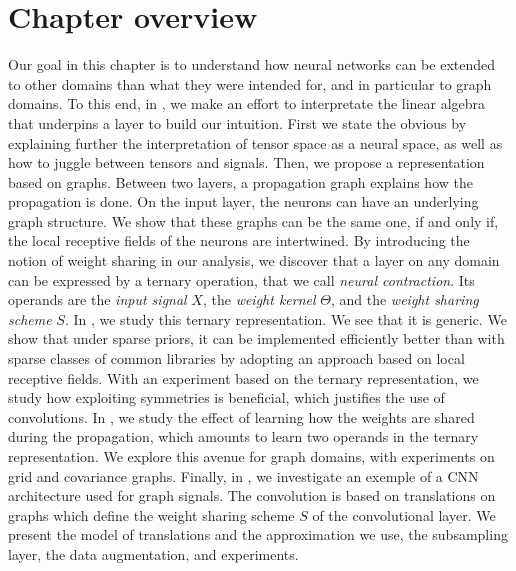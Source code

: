 \section*{Chapter overview}

Our goal in this chapter is to understand how neural networks can be extended to other domains than what they were intended for, and in particular to graph domains. To this end, in , we make an effort to interpretate the linear algebra that underpins a layer to build our intuition. First we state the obvious by explaining further the interpretation of tensor space as a neural space, as well as how to juggle between tensors and signals. Then, we propose a representation based on graphs. Between two layers, a propagation graph explains how the propagation is done. On the input layer, the neurons can have an underlying graph structure. We show that these graphs can be the same one, if and only if, the local receptive fields of the neurons are intertwined. By introducing the notion of weight sharing in our analysis, we discover that a layer on any domain can be expressed by a ternary operation, that we call \emph{neural contraction}. Its operands are the \emph{input signal} $X$, the \emph{weight kernel} $\Theta$, and the \emph{weight sharing scheme} $S$. In , we study this ternary representation. We see that it is generic. We show that under sparse priors, it can be implemented efficiently better than with sparse classes of common libraries by adopting an approach based on local receptive fields. With an experiment based on the ternary representation, we study how exploiting symmetries is beneficial, which justifies the use of convolutions. In , we study the effect of learning how the weights are shared during the propagation, which amounts to learn two operands in the ternary representation. We explore this avenue for graph domains, with experiments on grid and covariance graphs. Finally, in , we investigate an exemple of a CNN architecture used for graph signals. The convolution is based on translations on graphs which define the weight sharing scheme $S$ of the convolutional layer. We present the model of translations and the approximation we use, the subsampling layer, the data augmentation, and experiments.

